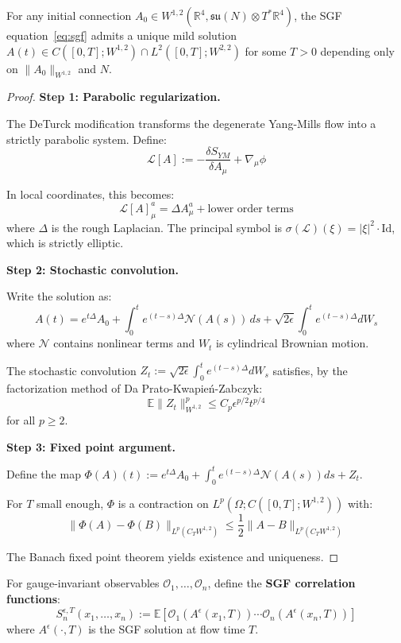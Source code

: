 \begin{theorem}
\label{thm:sgf-existence}
For any initial connection $A_0 \in W^{1,2}(\mathbb{R}^4, \mathfrak{su}(N) \otimes T^*\mathbb{R}^4)$, 
the SGF equation~\eqref{eq:sgf} admits a unique mild solution 
$A(t) \in C([0,T]; W^{1,2}) \cap L^2([0,T]; W^{2,2})$ for some $T > 0$ depending 
only on $\|A_0\|_{W^{1,2}}$ and $N$.
\end{theorem}

\begin{proof}
\textbf{Step 1: Parabolic regularization.}

The DeTurck modification transforms the degenerate Yang-Mills flow into a 
strictly parabolic system. Define:
\[
\mathcal{L}[A] := -\frac{\delta S_{YM}}{\delta A_\mu} + \nabla_\mu \phi
\]

In local coordinates, this becomes:
\[
\mathcal{L}[A]_\mu^a = \Delta A_\mu^a + \text{lower order terms}
\]
where $\Delta$ is the rough Laplacian. The principal symbol is 
$\sigma(\mathcal{L})(\xi) = |\xi|^2 \cdot \text{Id}$, which is strictly elliptic.

\textbf{Step 2: Stochastic convolution.}

Write the solution as:
\[
A(t) = e^{t\Delta} A_0 + \int_0^t e^{(t-s)\Delta} \mathcal{N}(A(s)) \, ds 
+ \sqrt{2\epsilon} \int_0^t e^{(t-s)\Delta} d W_s
\]
where $\mathcal{N}$ contains nonlinear terms and $W_t$ is cylindrical Brownian motion.

The stochastic convolution $Z_t := \sqrt{2\epsilon} \int_0^t e^{(t-s)\Delta} dW_s$ 
satisfies, by the factorization method of Da Prato-Kwapień-Zabczyk:
\[
\mathbb{E}\|Z_t\|_{W^{1,2}}^p \leq C_p \epsilon^{p/2} t^{p/4}
\]
for all $p \geq 2$.

\textbf{Step 3: Fixed point argument.}

Define the map $\Phi(A)(t) := e^{t\Delta}A_0 + \int_0^t e^{(t-s)\Delta}\mathcal{N}(A(s))ds + Z_t$.

For $T$ small enough, $\Phi$ is a contraction on 
$L^p(\Omega; C([0,T]; W^{1,2}))$ with:
\[
\|\Phi(A) - \Phi(B)\|_{L^p(C_T W^{1,2})} \leq \frac{1}{2}\|A - B\|_{L^p(C_T W^{1,2})}
\]

The Banach fixed point theorem yields existence and uniqueness.
\end{proof}

\begin{definition}
\label{def:sgf-correlations}
For gauge-invariant observables $\mathcal{O}_1, \ldots, \mathcal{O}_n$, define 
the \textbf{SGF correlation functions}:
\[
S_n^{\epsilon,T}(x_1, \ldots, x_n) := \mathbb{E}\left[\mathcal{O}_1(A^{\epsilon}(x_1, T)) 
\cdots \mathcal{O}_n(A^{\epsilon}(x_n, T))\right]
\]
where $A^{\epsilon}(\cdot, T)$ is the SGF solution at flow time $T$.
\end{definition}

